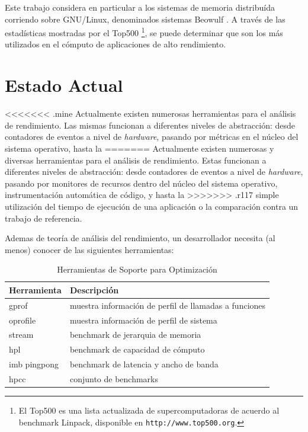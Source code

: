 \documentclass[a4paper]{report}
\begin{document}
Este trabajo considera en particular a los sistemas de memoria distribu\'ida corriendo sobre
GNU/Linux, denominados sistemas Beowulf \cite{beowulf}. A trav\'es de las
estad\'isticas mostradas por el Top500 \footnote{El Top500 es una lista actualizada de supercomputadoras
de acuerdo al benchmark Linpack, disponible en {\tt http://www.top500.org}.}, se
puede determinar que son los m\'as utilizados en el c\'omputo de aplicaciones de alto rendimiento.

\section{Estado Actual}

<<<<<<< .mine
Actualmente existen numerosas herramientas para el an\'alisis de rendimiento.
Las mismas funcionan a diferentes niveles de abstracci\'on: desde contadores de eventos
a nivel de {\it hardware}, pasando por m\'etricas en el n\'ucleo del sistema operativo, hasta la
=======
Actualmente existen numerosas y diversas herramientas para el an\'alisis de rendimiento.
Estas funcionan a diferentes niveles de abstracci\'on: desde contadores de eventos
a nivel de {\it hardware}, pasando por monitores de recursos dentro del n\'ucleo del sistema operativo,
instrumentaci\'on autom\'atica de c\'odigo, y hasta la
>>>>>>> .r117
simple utilizaci\'on del tiempo de ejecuci\'on de una aplicaci\'on o la comparaci\'on contra un trabajo de referencia.

\bigskip

Ademas de teor\'ia de an\'alisis del rendimiento, un desarrollador necesita
(al menos) conocer de las siguientes herramientas:

\begin{table}[H]
    \caption{Herramientas de Soporte para Optimizaci\'on}
    \centering
    \begin{tabular}{|l|l|}\hline
      {\bf Herramienta} & {\bf Descripci\'on} \\ \hline
      gprof & muestra informaci\'on de perfil de llamadas a funciones \\ \hline
      oprofile & muestra informaci\'on de perfil de sistema \\ \hline
      stream & benchmark de jerarquia de memoria \\ \hline
      hpl & benchmark de capacidad de c\'omputo \\ \hline
      imb pingpong & benchmark de latencia y ancho de banda \\ \hline
      hpcc & conjunto de benchmarks \\ \hline
    \end{tabular}
    \label{table:tools}
\end{table}
\end{document}
